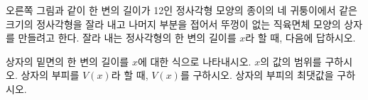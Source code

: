 \noindent\begin{minipage}[t]{0.58\linewidth}\vspace{0pt}\raggedright 오른쪽 그림과 같이 한 변의 길이가 12인 정사각형 모양의 종이의 네 귀퉁이에서 같은 크기의 정사각형을 잘라 내고 나머지 부분을 접어서 뚜껑이 없는 직육면체 모양의 상자를 만들려고 한다. 잘라 내는 정사각형의 한 변의 길이를 $x$라 할 때, 다음에 답하시오.\end{minipage}\hfill\begin{minipage}[t]{0.4\linewidth}\vspace{0pt}\centering \resizebox{\ifdim\width>\linewidth\linewidth\else\width\fi}{!}{}\end{minipage}\par
{} 상자의 밑면의 한 변의 길이를 $x$에 대한 식으로 나타내시오.
 $x$의 값의 범위를 구하시오.
 상자의 부피를 $V(x)$라 할 때, $V(x)$를 구하시오.
 상자의 부피의 최댓값을 구하시오.
